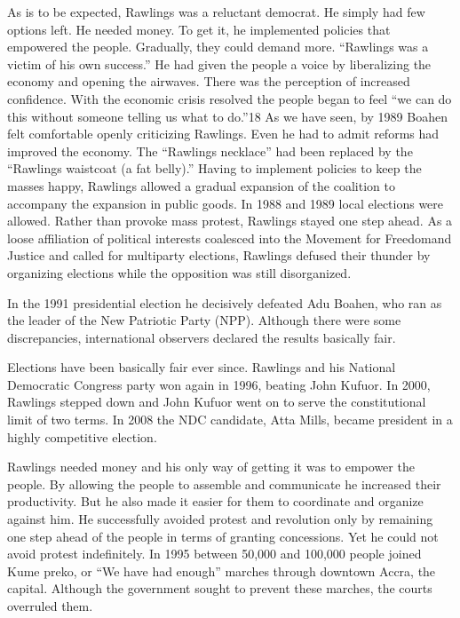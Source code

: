 \documentclass[10pt]{article}
\begin{document}
{\large As is to be expected, Rawlings was a reluctant democrat. He simply had
few options left. He needed money. To get it, he implemented policies that
empowered the people. Gradually, they could demand more. ``Rawlings was a victim
of his own success.'' He had given the people a voice by liberalizing the economy
and opening the airwaves. There was the perception of increased confidence. With
the economic crisis resolved the people began to feel ``we can do this without
someone telling us what to do.''18 As we have seen, by 1989 Boahen felt
comfortable openly criticizing Rawlings. Even he had to admit reforms had
improved the economy. The ``Rawlings necklace'' had been replaced by the
``Rawlings waistcoat (a fat belly).'' Having to implement policies to keep the
masses happy, Rawlings allowed a gradual expansion of the coalition to accompany
the expansion in public goods. In 1988 and 1989 local elections were allowed.
Rather than provoke mass protest, Rawlings stayed one step ahead. As a loose
affiliation of political interests coalesced into the Movement for Freedomand
Justice and called for multiparty elections, Rawlings defused their thunder by
organizing elections while the opposition was still disorganized.}

{\large In the 1991 presidential election he decisively defeated Adu Boahen, who
ran as the leader of the New Patriotic Party (NPP). Although there were some
discrepancies, international observers declared the results basically fair.}

{\large Elections have been basically fair ever since. Rawlings and his National
Democratic Congress party won again in 1996, beating John Kufuor. In 2000,
Rawlings stepped down and John Kufuor went on to serve the constitutional limit
of two terms. In 2008 the NDC candidate, Atta Mills, became president in a highly
competitive election.}

{\large Rawlings needed money and his only way of getting it was to empower the
people. By allowing the people to assemble and communicate he increased their
productivity. But he also made it easier for them to coordinate and organize
against him. He successfully avoided protest and revolution only by remaining one
step ahead of the people in terms of granting concessions. Yet he could not avoid
protest indefinitely. In 1995 between 50,000 and 100,000 people joined Kume
preko, or ``We have had enough'' marches through downtown Accra, the capital.
Although the government sought to prevent these marches, the courts overruled
them.}
\end{document}
